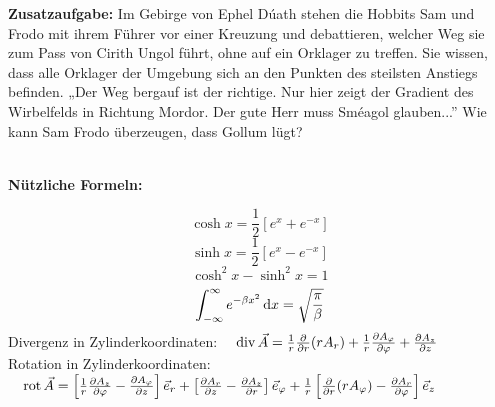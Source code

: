 \documentclass{atistandalonetask}
\begin{document}
\begin{atiTask}[
	title = Weitere Fragen
]
\textbf{Zusatzaufgabe:} Im Gebirge von Ephel Dúath stehen die Hobbits Sam und Frodo mit ihrem Führer vor einer Kreuzung und debattieren, welcher Weg sie zum Pass von Cirith Ungol führt, ohne auf ein Orklager zu treffen. Sie wissen, dass alle Orklager der Umgebung sich an den Punkten des steilsten Anstiegs befinden. „Der Weg bergauf ist der richtige. Nur hier zeigt der Gradient des Wirbelfelds in Richtung Mordor. Der gute Herr muss Sméagol glauben...” Wie kann Sam Frodo überzeugen, dass Gollum lügt? 

~\\[0.6cm]
\textbf{Nützliche Formeln:}

\[\cosh x =\frac{1}{2}[e^x+e^{-x}]
\]
\[\sinh x =\frac{1}{2}[e^x-e^{-x}]
\]
\[
\cosh^2 x- \sinh^2 x=1
\]
\[
\int_{-\infty}^{\infty} e^{-\beta x^2}\,\mathrm{d} x=\sqrt{\frac{\pi}{\beta}}
\]
Divergenz in Zylinderkoordinaten: $\quad \divergence \vec{A} = \frac{1}{r} \leibnizPartialDerivative{}{r} (rA_r) + \frac{1}{r} \leibnizPartialDerivative{A_\varphi}{\varphi} + \leibnizPartialDerivative{A_z}{z}$ \\[0.2cm]
Rotation in Zylinderkoordinaten: $\quad \curl \vec{A} = \left[ \frac{1}{r} \leibnizPartialDerivative{A_z}{\varphi} - \leibnizPartialDerivative{A_\varphi}{z} \right]\vec{e}_r + \left[ \leibnizPartialDerivative{A_r}{z} - \leibnizPartialDerivative{A_z}{r} \right] \vec{e}_\varphi + \frac{1}{r} \left[ \leibnizPartialDerivative{}{r} (rA_\varphi) - \leibnizPartialDerivative{A_r}{\varphi} \right] \vec{e}_z$ \\

\end{atiTask}
\end{document}
